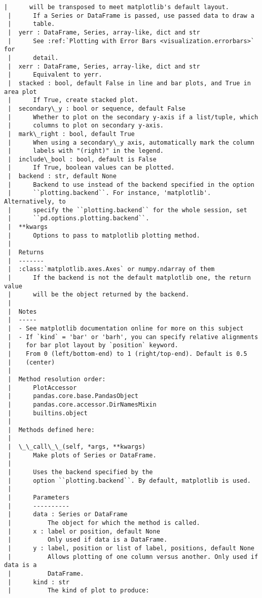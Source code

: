 \documentclass[11pt]{article}
\begin{document}
\begin{Verbatim}[commandchars=\\\{\}]
 |      will be transposed to meet matplotlib's default layout.
 |      If a Series or DataFrame is passed, use passed data to draw a
 |      table.
 |  yerr : DataFrame, Series, array-like, dict and str
 |      See :ref:`Plotting with Error Bars <visualization.errorbars>` for
 |      detail.
 |  xerr : DataFrame, Series, array-like, dict and str
 |      Equivalent to yerr.
 |  stacked : bool, default False in line and bar plots, and True in area plot
 |      If True, create stacked plot.
 |  secondary\_y : bool or sequence, default False
 |      Whether to plot on the secondary y-axis if a list/tuple, which
 |      columns to plot on secondary y-axis.
 |  mark\_right : bool, default True
 |      When using a secondary\_y axis, automatically mark the column
 |      labels with "(right)" in the legend.
 |  include\_bool : bool, default is False
 |      If True, boolean values can be plotted.
 |  backend : str, default None
 |      Backend to use instead of the backend specified in the option
 |      ``plotting.backend``. For instance, 'matplotlib'. Alternatively, to
 |      specify the ``plotting.backend`` for the whole session, set
 |      ``pd.options.plotting.backend``.
 |  **kwargs
 |      Options to pass to matplotlib plotting method.
 |
 |  Returns
 |  -------
 |  :class:`matplotlib.axes.Axes` or numpy.ndarray of them
 |      If the backend is not the default matplotlib one, the return value
 |      will be the object returned by the backend.
 |
 |  Notes
 |  -----
 |  - See matplotlib documentation online for more on this subject
 |  - If `kind` = 'bar' or 'barh', you can specify relative alignments
 |    for bar plot layout by `position` keyword.
 |    From 0 (left/bottom-end) to 1 (right/top-end). Default is 0.5
 |    (center)
 |
 |  Method resolution order:
 |      PlotAccessor
 |      pandas.core.base.PandasObject
 |      pandas.core.accessor.DirNamesMixin
 |      builtins.object
 |
 |  Methods defined here:
 |
 |  \_\_call\_\_(self, *args, **kwargs)
 |      Make plots of Series or DataFrame.
 |
 |      Uses the backend specified by the
 |      option ``plotting.backend``. By default, matplotlib is used.
 |
 |      Parameters
 |      ----------
 |      data : Series or DataFrame
 |          The object for which the method is called.
 |      x : label or position, default None
 |          Only used if data is a DataFrame.
 |      y : label, position or list of label, positions, default None
 |          Allows plotting of one column versus another. Only used if data is a
 |          DataFrame.
 |      kind : str
 |          The kind of plot to produce:

\end{Verbatim}
\end{document}
